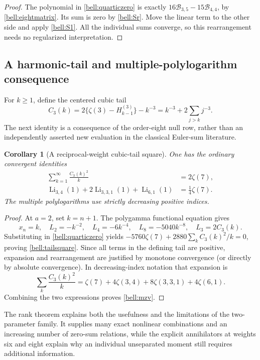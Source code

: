 \documentclass[11pt,a4paper]{article}
\numberwithin{equation}{section}
\newtheorem{corollary}[theorem]{Corollary}
\theoremstyle{definition}
\theoremstyle{remark}
\DeclareMathOperator{\Li}{Li}
\begin{document}
\begin{proof}
The polynomial in \eqref{bell:quarticzero} is exactly
$16\mathcal B_{3,5}-15\mathcal B_{4,4}$, by \eqref{bell:eightmatrix}.
Its sum is zero by \eqref{bell:Sr}. Move the linear term to the other
side and apply \eqref{bell:S1}. All the individual sums converge,
so this rearrangement needs no regularized interpretation.
\end{proof}

\subsection{A harmonic-tail and multiple-polylogarithm consequence}

For $k\ge1$, define the centered cubic tail
\[
 C_3(k)=2\{\zeta(3)-H_{k-1}^{(3)}\}-k^{-3}
       =k^{-3}+2\sum_{j>k}j^{-3}.
\]
The next identity is a consequence of the order-eight null row, rather
than an independently asserted new evaluation in the classical Euler-sum
literature.

\begin{corollary}[A reciprocal-weight cubic-tail square]
\label{bell:harmonic}
One has the ordinary convergent identities
\begin{align}
 \sum_{k=1}^{\infty}\frac{C_3(k)^2}{k}&=2\zeta(7),\label{bell:tailsquare}\\
 \Li_{3,4}(1)+2\Li_{3,3,1}(1)+\Li_{6,1}(1)&=\frac14\zeta(7).
 \label{bell:mzv}
\end{align}
The multiple polylogarithms use strictly decreasing positive indices.
\end{corollary}

\begin{proof}
At $a=2$, set $k=n+1$. The polygamma functional equation gives
\[
 x_n=k,\quad L_2=-k^{-2},\quad L_4=-6k^{-4},\quad
 L_8=-5040k^{-8},\quad L_3=2C_3(k).
\]
Substituting in \eqref{bell:quarticzero} yields
$-5760\zeta(7)+2880\sum_k C_3(k)^2/k=0$, proving
\eqref{bell:tailsquare}. Since all terms in the defining tail are
positive, expansion and rearrangement are justified by monotone
convergence (or directly by absolute convergence). In decreasing-index
notation that expansion is
\[
 \sum_k\frac{C_3(k)^2}{k}
 =\zeta(7)+4\zeta(3,4)+8\zeta(3,3,1)+4\zeta(6,1).
\]
Combining the two expressions proves \eqref{bell:mzv}.
\end{proof}

The rank theorem explains both the usefulness and the limitations of
the two-parameter family. It supplies many exact nonlinear combinations
and an increasing number of zero-sum relations, while the explicit
annihilators at weights six and eight explain why an individual
unseparated moment still requires additional information.
\end{document}
